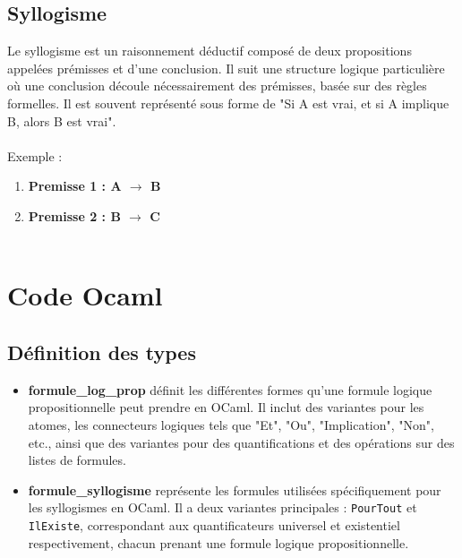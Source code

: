 \documentclass{article}
\begin{document}
\subsection{\textbf{Syllogisme}}
Le syllogisme est un raisonnement déductif composé de deux propositions appelées prémisses et d'une conclusion. Il suit une structure logique particulière où une conclusion découle nécessairement des prémisses, basée sur des règles formelles. Il est souvent représenté sous forme de "Si A est vrai, et si A implique B, alors B est vrai".\\\\
Exemple : 
\begin{enumerate}
\item \textbf{Premisse 1 : A $\rightarrow$ B}
\item \textbf{Premisse 2 : B $\rightarrow$ C}\\\\

\begin{center}
\end{center}
\end{enumerate}
\newpage

\section{Code Ocaml}

\subsection{\textbf{Définition des types}}
\begin{itemize}
\item
\textbf{formule\_log\_prop} définit les différentes formes qu'une formule logique propositionnelle peut prendre en OCaml. Il inclut des variantes pour les atomes, les connecteurs logiques tels que "Et", "Ou", "Implication", "Non", etc., ainsi que des variantes pour des quantifications et des opérations sur des listes de formules.
\item
\textbf{formule\_syllogisme} représente les formules utilisées spécifiquement pour les syllogismes en OCaml. Il a deux variantes principales : \texttt{PourTout} et \texttt{IlExiste}, correspondant aux quantificateurs universel et existentiel respectivement, chacun prenant une formule logique propositionnelle.
\end{itemize}
\end{document}
